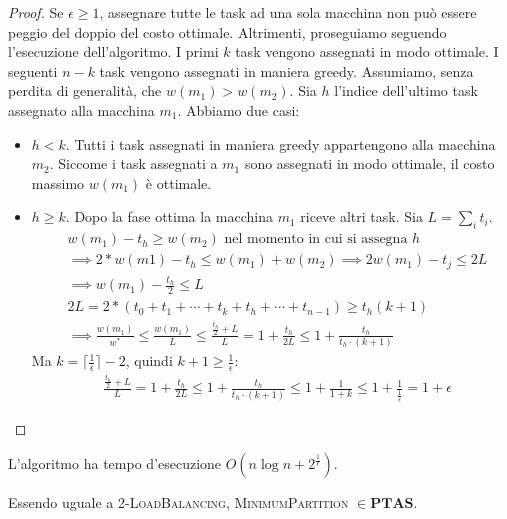 \begin{proof}
	Se $\epsilon \geq 1$, assegnare tutte le task ad una sola macchina non può
	essere peggio del doppio del costo ottimale.
	Altrimenti, proseguiamo seguendo l'esecuzione dell'algoritmo.
	I primi $k$ task vengono assegnati in modo ottimale. I seguenti $n - k$ task
	vengono assegnati in maniera greedy. Assumiamo, senza perdita di generalità,
	che $w(m_1) > w(m_2)$. Sia $h$ l'indice dell'ultimo task assegnato alla
	macchina $m_1$. Abbiamo due casi:
	\begin{itemize}
		\item $h < k$. Tutti i task assegnati in maniera greedy appartengono alla
		      macchina $m_2$. Siccome i task assegnati a $m_1$ sono assegnati in
		      modo ottimale, il costo massimo $w(m_1)$ è ottimale.
		\item $h \geq k$. Dopo la fase ottima la macchina $m_1$ riceve altri task.
		      Sia $L = \sum_{i} t_i$.
		      \begin{align*}
			       & w(m_1) - t_h  \geq w(m_2) \text{ nel momento in cui si assegna } h                                    \\
			       & \implies 2*w(m1) - t_h \leq w(m_1) + w(m_2) \implies 2w(m_1) - t_j \leq 2L                            \\
			       & \implies w(m_1) - \frac{t_h}{2} \leq L                                                                \\
			       & 2L  = 2 * ( t_0 + t_1 + \cdots + t_k + t_h + \cdots + t_{n-1}) \geq t_h (k+1)                         \\
			       & \implies \frac{w(m_1)}{w^*} \leq \frac{w(m_1)}{L} \leq \frac{\frac{t_h}{2}+L}{L} = 1 + \frac{t_h}{2L}
			      \leq 1 + \frac{t_h}{t_h \cdot (k+1)}
		      \end{align*}
		      Ma $k = \lceil \frac{1}{\epsilon}\rceil -2$, quindi $k + 1 \geq \frac{1}{\epsilon}$:
		      \begin{align*}
			       & \frac{\frac{t_h}{2}+L}{L} = 1 + \frac{t_h}{2L} \leq 1 + \frac{t_h}{t_h \cdot (k+1)}
			      \leq 1 + \frac{1}{1 + k} \leq 1 + \frac{1}{\frac{1}{\epsilon}} = 1 + \epsilon
		      \end{align*}
	\end{itemize}
\end{proof}

\begin{theorem}
	L'algoritmo ha tempo d'esecuzione $O(n\log{n} + 2^{\frac{1}{\epsilon}})$.
\end{theorem}
\begin{corollario}
	Essendo uguale a \textsc{2-LoadBalancing},  \textsc{MinimumPartition} $\in \mathbf{PTAS}$.
\end{corollario}

